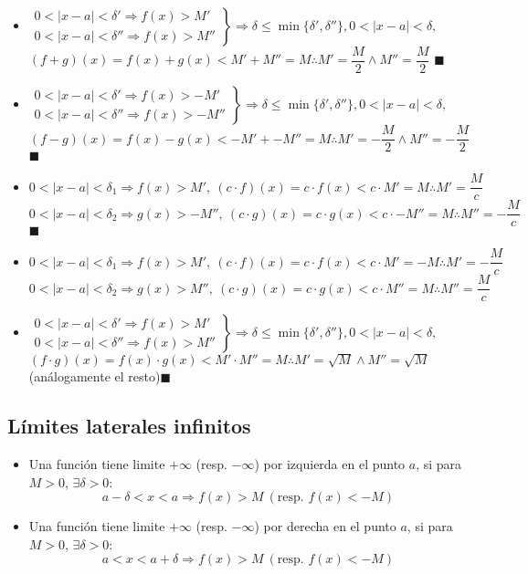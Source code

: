 \documentclass[11pt,a4paper]{article}
\newcommand*{\QEDA}{\null\nobreak\hfill\ensuremath{\blacksquare}}
\begin{document}
\begin{itemize}
\item $ \left.
\begin{array}{l}
0<|x-a|<\delta' \Rightarrow f(x)>M'\\
0<|x-a|<\delta'' \Rightarrow f(x)>M''
\end{array} \right\} \Rightarrow \delta \leq \min\{\delta', \delta''\}, 0<|x-a|<\delta,
$\\
$(f+g)(x) = f(x)+g(x) < M' + M'' = M \therefore M' = \dfrac{M}{2} \land M'' = \dfrac{M}{2}$ \QEDA

\item $ \left.
\begin{array}{l}
0<|x-a|<\delta' \Rightarrow f(x)>-M'\\
0<|x-a|<\delta'' \Rightarrow f(x)>-M''
\end{array} \right\} \Rightarrow \delta \leq \min\{\delta', \delta''\}, 0<|x-a|<\delta,
$\\
$(f-g)(x) = f(x)-g(x) < -M' + -M'' = M \therefore M' = -\dfrac{M}{2} \land M'' = -\dfrac{M}{2}$ \QEDA

\item $0<|x-a|<\delta_1 \Rightarrow f(x) > M',\ (c\cdot f)(x)=c\cdot f(x) < c\cdot M' = M \therefore M'=\dfrac{M}{c}$\\
\indent $0<|x-a|<\delta_2 \Rightarrow g(x) > -M'',\ (c\cdot g)(x)=c\cdot g(x) < c\cdot -M'' = M \therefore M''= - \dfrac{M}{c}$ \QEDA

\item $0<|x-a|<\delta_1 \Rightarrow f(x) > M',\ (c\cdot f)(x)=c\cdot f(x) < c\cdot M' = -M \therefore M'=-\dfrac{M}{c}$\\
\indent $0<|x-a|<\delta_2 \Rightarrow g(x) > M'',\ (c\cdot g)(x)=c\cdot g(x) < c\cdot M'' = M \therefore M''=\dfrac{M}{c}$

\item $ \left.
\begin{array}{l}
0<|x-a|<\delta' \Rightarrow f(x)>M'\\
0<|x-a|<\delta'' \Rightarrow f(x)>M''
\end{array} \right\} \Rightarrow \delta \leq \min\{\delta', \delta''\}, 0<|x-a|<\delta,
$\\
$(f\cdot g)(x) = f(x)\cdot g(x) < M' \cdot M'' = M \therefore M' = \sqrt{M} \land M'' = \sqrt{M}$ (an\'alogamente el resto)\QEDA
\end{itemize}
\subsection{L\'imites laterales infinitos}
\begin{itemize}
\item Una funci\'on tiene limite $+\infty$ (resp. $-\infty$) por izquierda en el punto $a$, si para $M>0$, $\exists \delta>0$: $$a-\delta<x<a \Rightarrow f(x) > M\ (\text{resp. } f(x)<-M)$$
\item Una funci\'on tiene limite $+\infty$ (resp. $-\infty$) por derecha en el punto $a$, si para $M>0$, $\exists \delta>0$: $$a<x<a+\delta \Rightarrow f(x) > M\ (\text{resp. } f(x)<-M)$$
\end{itemize}
\end{document}
